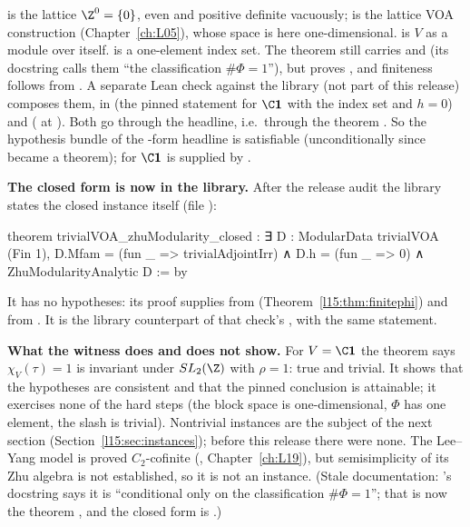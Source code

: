\begin{dictionary}
 is the lattice $\Z^0=\{0\}$, even and positive definite vacuously;  is the
lattice VOA construction (Chapter~\ref{ch:L05}), whose space is here one-dimensional.  is $V$ as a module
over itself.  is a one-element index set. The theorem  still carries
 and  (its docstring calls them ``the classification $\#\Phi=1$''), but
 proves , and finiteness follows from . A separate Lean check
against the library (not part of this release) composes them, in \allowbreak{} (the
pinned statement for $\C\lfifteenvac$ with the index set  and $h=0$) and \allowbreak{}
( at ).
Both go through the  headline, i.e.\ through the theorem . So the hypothesis bundle of the
-form headline is satisfiable (unconditionally since  became a theorem);  for $\C\lfifteenvac$ is
supplied by .

\textbf{The closed form is now in the library.} After the release audit the library states the closed instance itself
(file ):
\begin{leancode}
theorem trivialVOA_zhuModularity_closed :
    ∃ D : ModularData trivialVOA (Fin 1),
      D.Mfam = (fun _ => trivialAdjointIrr) ∧ D.h = (fun _ => 0) ∧ ZhuModularityAnalytic D := by
\end{leancode}
It has no hypotheses: its proof supplies  from
 (Theorem~\ref{l15:thm:finitephi}) and  from
. It is the library counterpart of that check's \allowbreak{}, with
the same statement.
\end{dictionary}

\begin{warning}
\textbf{What the witness does and does not show.} For $V=\C\lfifteenvac$ the theorem says $\chi_V(\tau)=1$ is invariant under
$\lfifteenSL$ with $\rho=1$: true and trivial. It shows that the hypotheses are consistent and that the pinned conclusion is
attainable; it exercises none of the hard steps (the block space is one-dimensional, $\Phi$ has one element, the slash is
trivial). Nontrivial instances are the subject of the next section (Section~\ref{l15:sec:instances}); before this
release there were none. The Lee--Yang model is proved $C_2$-cofinite (,
Chapter~\ref{ch:L19}), but semisimplicity of its Zhu algebra is not established, so it is not an instance.
(Stale documentation: 's docstring says it is ``conditional only on the classification
$\#\Phi=1$''; that is now the theorem , and the closed form is .)
\end{warning}

